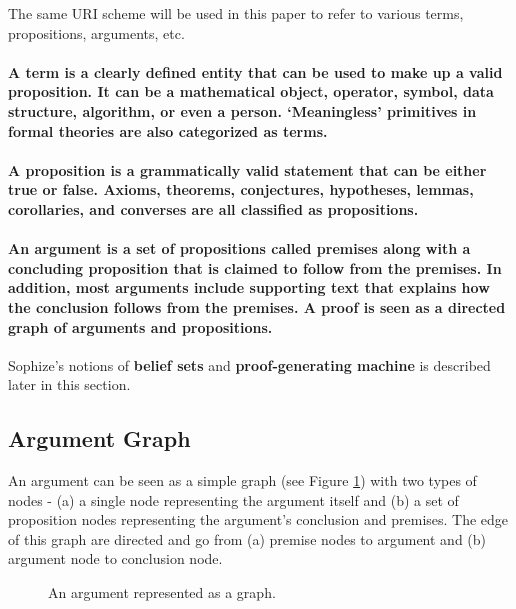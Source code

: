 \documentclass[a4paper]{article}
\begin{document}
The same URI scheme will be used in this paper to refer to various terms, propositions, arguments, etc.

\paragraph{A \textbf{term} is a clearly defined entity that can be used to make up a valid proposition. It can be a mathematical object, operator, symbol, data structure, algorithm, or even a person. `Meaningless' primitives in formal theories are also categorized as terms.}

\paragraph{A \textbf{proposition} is a grammatically valid statement that can be either true or false. Axioms, theorems, conjectures, hypotheses, lemmas, corollaries, and converses are all classified as propositions.}

\paragraph{An \textbf{argument} is a set of propositions called premises along with a concluding proposition that is claimed to follow from the premises. In addition, most arguments include supporting text that explains how the conclusion follows from the premises. A proof is seen as a directed graph of arguments and propositions.}

Sophize's notions of \textbf{belief sets} and \textbf{proof-generating machine} is described later in this section.

\subsection{Argument Graph}
An argument can be seen as a simple graph (see Figure \ref{argument}) with two types of nodes - (a) a single node representing the argument itself and (b) a set of proposition nodes representing the argument's conclusion and premises. The edge of this graph are directed and go from (a) premise nodes to argument and (b) argument node to conclusion node.

\begin{figure}[ht]
\begin{center}
\caption{An argument represented as a graph.}
\label{argument}
\end{center}
\end{figure}
\end{document}
